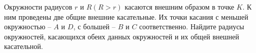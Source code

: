 \begin{ex}
	\begin{condition}
		Окружности радиусов \( r \) и \( R (R > r)  \) касаются внешним образом в точке \( K \). К ним проведены две общие внешние касательные. Их точки касания с меньшей окружностью – \( A  \) и \( D \), с большей – \( B  \) и \( C  \) соответственно. Найдите радиусы окружностей, касающихся обеих данных окружностей и их общей внешней касательной.
	\end{condition}
\end{ex}